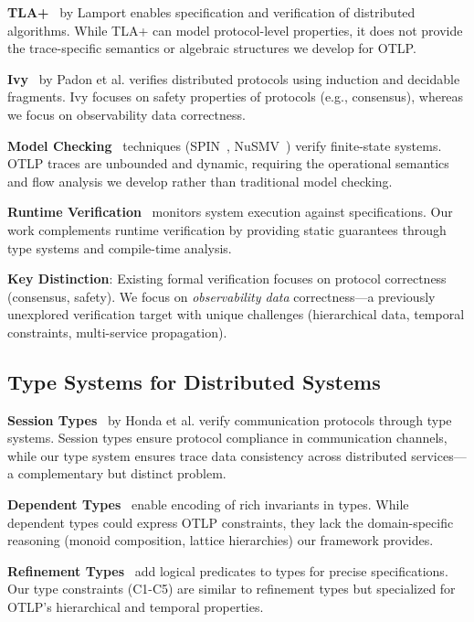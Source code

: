 \textbf{TLA+}~\cite{lamport2002specifying} by Lamport enables specification and verification of distributed algorithms. While TLA+ can model protocol-level properties, it does not provide the trace-specific semantics or algebraic structures we develop for OTLP.

\textbf{Ivy}~\cite{padon2016ivy} by Padon et al. verifies distributed protocols using induction and decidable fragments. Ivy focuses on safety properties of protocols (e.g., consensus), whereas we focus on observability data correctness.

\textbf{Model Checking}~\cite{clarke1999model} techniques (SPIN~\cite{holzmann1997spin}, NuSMV~\cite{cimatti2000nusmv}) verify finite-state systems. OTLP traces are unbounded and dynamic, requiring the operational semantics and flow analysis we develop rather than traditional model checking.

\textbf{Runtime Verification}~\cite{leucker2009runtime} monitors system execution against specifications. Our work complements runtime verification by providing static guarantees through type systems and compile-time analysis.

\textbf{Key Distinction}: Existing formal verification focuses on protocol correctness (consensus, safety). We focus on \textit{observability data} correctness—a previously unexplored verification target with unique challenges (hierarchical data, temporal constraints, multi-service propagation).

\subsection{Type Systems for Distributed Systems}
\label{sec:related-types}

\textbf{Session Types}~\cite{honda1993types,honda2008multiparty} by Honda et al. verify communication protocols through type systems. Session types ensure protocol compliance in communication channels, while our type system ensures trace data consistency across distributed services—a complementary but distinct problem.

\textbf{Dependent Types}~\cite{xi1999dependent} enable encoding of rich invariants in types. While dependent types could express OTLP constraints, they lack the domain-specific reasoning (monoid composition, lattice hierarchies) our framework provides.

\textbf{Refinement Types}~\cite{rondon2008liquid} add logical predicates to types for precise specifications. Our type constraints (C1-C5) are similar to refinement types but specialized for OTLP's hierarchical and temporal properties.

